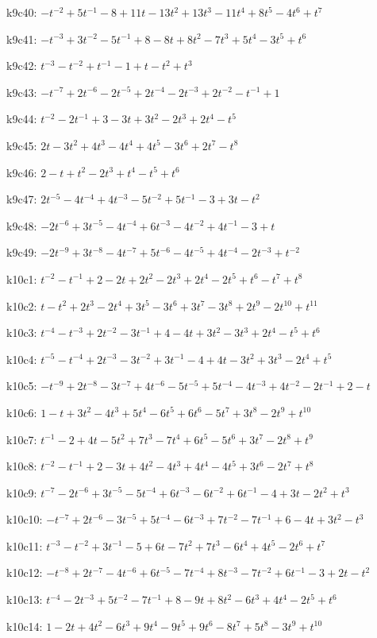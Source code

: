 k9c40: $-t^{-2}+5t^{-1}-8+11t-13t^{2}+13t^{3}-11t^{4}+8t^{5}-4t^{6}+t^{7}$

k9c41: $-t^{-3}+3t^{-2}-5t^{-1}+8-8t+8t^{2}-7t^{3}+5t^{4}-3t^{5}+t^{6}$

k9c42: $t^{-3}-t^{-2}+t^{-1}-1+t-t^{2}+t^{3}$

k9c43: $-t^{-7}+2t^{-6}-2t^{-5}+2t^{-4}-2t^{-3}+2t^{-2}-t^{-1}+1$

k9c44: $t^{-2}-2t^{-1}+3-3t+3t^{2}-2t^{3}+2t^{4}-t^{5}$

k9c45: $2t-3t^{2}+4t^{3}-4t^{4}+4t^{5}-3t^{6}+2t^{7}-t^{8}$

k9c46: $2-t+t^{2}-2t^{3}+t^{4}-t^{5}+t^{6}$

k9c47: $2t^{-5}-4t^{-4}+4t^{-3}-5t^{-2}+5t^{-1}-3+3t-t^{2}$

k9c48: $-2t^{-6}+3t^{-5}-4t^{-4}+6t^{-3}-4t^{-2}+4t^{-1}-3+t$

k9c49: $-2t^{-9}+3t^{-8}-4t^{-7}+5t^{-6}-4t^{-5}+4t^{-4}-2t^{-3}+t^{-2}$

k10c1: $t^{-2}-t^{-1}+2-2t+2t^{2}-2t^{3}+2t^{4}-2t^{5}+t^{6}-t^{7}+t^{8}$

k10c2: $t-t^{2}+2t^{3}-2t^{4}+3t^{5}-3t^{6}+3t^{7}-3t^{8}+2t^{9}-2t^{10}+t^{11}$

k10c3: $t^{-4}-t^{-3}+2t^{-2}-3t^{-1}+4-4t+3t^{2}-3t^{3}+2t^{4}-t^{5}+t^{6}$

k10c4: $t^{-5}-t^{-4}+2t^{-3}-3t^{-2}+3t^{-1}-4+4t-3t^{2}+3t^{3}-2t^{4}+t^{5}$

k10c5: $-t^{-9}+2t^{-8}-3t^{-7}+4t^{-6}-5t^{-5}+5t^{-4}-4t^{-3}+4t^{-2}-2t^{-1}+2-t$

k10c6: $1-t+3t^{2}-4t^{3}+5t^{4}-6t^{5}+6t^{6}-5t^{7}+3t^{8}-2t^{9}+t^{10}$

k10c7: $t^{-1}-2+4t-5t^{2}+7t^{3}-7t^{4}+6t^{5}-5t^{6}+3t^{7}-2t^{8}+t^{9}$

k10c8: $t^{-2}-t^{-1}+2-3t+4t^{2}-4t^{3}+4t^{4}-4t^{5}+3t^{6}-2t^{7}+t^{8}$

k10c9: $t^{-7}-2t^{-6}+3t^{-5}-5t^{-4}+6t^{-3}-6t^{-2}+6t^{-1}-4+3t-2t^{2}+t^{3}$

k10c10: $-t^{-7}+2t^{-6}-3t^{-5}+5t^{-4}-6t^{-3}+7t^{-2}-7t^{-1}+6-4t+3t^{2}-t^{3}$

k10c11: $t^{-3}-t^{-2}+3t^{-1}-5+6t-7t^{2}+7t^{3}-6t^{4}+4t^{5}-2t^{6}+t^{7}$

k10c12: $-t^{-8}+2t^{-7}-4t^{-6}+6t^{-5}-7t^{-4}+8t^{-3}-7t^{-2}+6t^{-1}-3+2t-t^{2}$

k10c13: $t^{-4}-2t^{-3}+5t^{-2}-7t^{-1}+8-9t+8t^{2}-6t^{3}+4t^{4}-2t^{5}+t^{6}$

k10c14: $1-2t+4t^{2}-6t^{3}+9t^{4}-9t^{5}+9t^{6}-8t^{7}+5t^{8}-3t^{9}+t^{10}$

